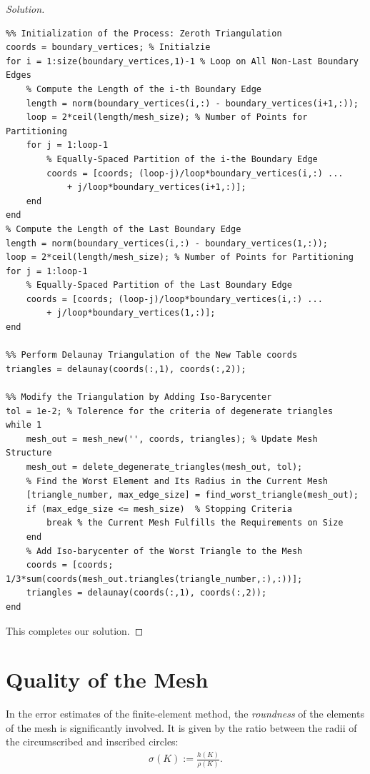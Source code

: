 \documentclass[11pt,a4paper,center,notitlepage]{article}
\numberwithin{equation}{section}
\begin{document}
\begin{proof}[Solution]
\begin{verbatim}
%% Initialization of the Process: Zeroth Triangulation
coords = boundary_vertices; % Initialzie
for i = 1:size(boundary_vertices,1)-1 % Loop on All Non-Last Boundary Edges
    % Compute the Length of the i-th Boundary Edge
    length = norm(boundary_vertices(i,:) - boundary_vertices(i+1,:));
    loop = 2*ceil(length/mesh_size); % Number of Points for Partitioning
    for j = 1:loop-1
        % Equally-Spaced Partition of the i-the Boundary Edge
        coords = [coords; (loop-j)/loop*boundary_vertices(i,:) ...
            + j/loop*boundary_vertices(i+1,:)];
    end
end
% Compute the Length of the Last Boundary Edge
length = norm(boundary_vertices(i,:) - boundary_vertices(1,:));
loop = 2*ceil(length/mesh_size); % Number of Points for Partitioning
for j = 1:loop-1
    % Equally-Spaced Partition of the Last Boundary Edge
    coords = [coords; (loop-j)/loop*boundary_vertices(i,:) ...
        + j/loop*boundary_vertices(1,:)];
end

%% Perform Delaunay Triangulation of the New Table coords
triangles = delaunay(coords(:,1), coords(:,2));

%% Modify the Triangulation by Adding Iso-Barycenter
tol = 1e-2; % Tolerence for the criteria of degenerate triangles
while 1
    mesh_out = mesh_new('', coords, triangles); % Update Mesh Structure
    mesh_out = delete_degenerate_triangles(mesh_out, tol);
    % Find the Worst Element and Its Radius in the Current Mesh
    [triangle_number, max_edge_size] = find_worst_triangle(mesh_out);
    if (max_edge_size <= mesh_size)  % Stopping Criteria
        break % the Current Mesh Fulfills the Requirements on Size
    end
    % Add Iso-barycenter of the Worst Triangle to the Mesh
    coords = [coords; 1/3*sum(coords(mesh_out.triangles(triangle_number,:),:))];
    triangles = delaunay(coords(:,1), coords(:,2));
end
\end{verbatim}
This completes our solution.
\end{proof}






\section{Quality of the Mesh}
In the error estimates of the finite-element method, the \textit{roundness} of the elements of the mesh is significantly involved. It is given by the ratio between the radii of the circumscribed and inscribed circles:
\begin{align}
\sigma \left( K \right) := \frac{{h\left( K \right)}}{{\rho \left( K \right)}}.
\end{align}
\end{document}
